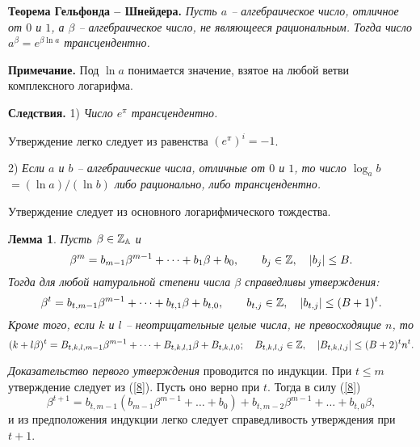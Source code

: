 \documentclass[12pt]{article}
\newtheorem{lemma}{Лемма}
\begin{document}

%


\vskip 5mm



{\bf Теорема Гельфонда -- Шнейдера.} {\it Пусть
$a$ -- алгебраическое число, отличное от $0$  и
$1$, а $\beta$   -- алгебраическое число, не
являющееся рациональным.  Тогда число
$a^{\beta}=e^{\beta\ln a}$ трансцендентно.}
\vskip 3mm


{\bf Примечание.} Под $\ln a$ понимается
значение, взятое на любой ветви комплексного
логарифма.\vskip 3mm


{\bf Следствия.} 1)  {\it  Число $e^{\pi}$
трансцендентно.}\vskip 3mm


 Утверждение легко следует из равенства
$(e^{\pi})^i=-1$. \vskip 3mm

 2) {\it Если $a$  и $b$ -- алгебраические числа,
отличные  от $0$  и $1$, то число $\log_ab$
$=(\ln a)/(\ln b)$ либо рационально, либо
трансцендентно.}\vskip 3mm


Утверждение следует из основного логарифмического
тождества.



 \begin{lemma}\label{O}  Пусть $\beta\in\Bbb Z_{\Bbb A}$ и
\begin{equation}\label{8}
\beta^m=b_{m-1}\beta^{m-1}+ \dots +b_1\beta +
b_0, \qquad b_j\in \Bbb Z, \quad |b_j| \le B.
\end{equation}
Тогда для любой натуральной степени   числа
$\beta$ справедливы утверждения:
$$
\beta^t=b_{t,m-1}\beta^{m-1}+\dots + b_{t,1}\beta +b_{t,0}, \qquad
b_{t,j}\in\Bbb Z, \quad |b_{t,j}| \le (B+1)^t.
$$
Кроме того, если $k$  и $l$   -- неотрицательные целые числа, не
превосходящие $n$,  то
$$
(k+l\beta)^t=B_{t,k,l,m-1}\beta^{m-1}+\dots +B_{t,k,l,1}\beta
+B_{t,k,l,0}; \quad B_{t,k,l,j}\in \Bbb Z, \quad |B_{t,k,l,j}|\le
(B+2)^tn^t.
$$
\end{lemma}



\emph{Доказательство первого утверждения     }
проводится по индукции. При $t\le m$ утверждение
следует из (\ref{8}). Пусть оно верно при $t$.
Тогда в силу (\ref{8})
$$
\beta^{t+1}=b_{t,m-1}(b_{m-1}\beta^{m-1}+ \dots +b_0)+
b_{t,m-2}\beta^{m-1}+ \dots +b_{t,0}\beta,
$$
и из предположения индукции легко следует справедливость
утверждения  при $t+1$.
\end{document}
